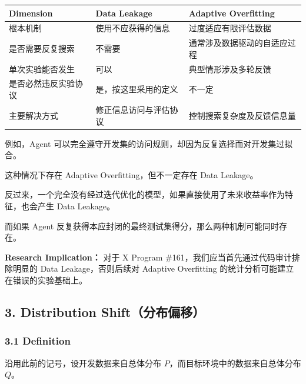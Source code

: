 \begin{readertable}
\begin{longtable}[]{@{}
  >{\raggedright\arraybackslash}p{}
  >{\raggedright\arraybackslash}p{}
  >{\raggedright\arraybackslash}p{}@{}}
\toprule
Dimension & Data Leakage & Adaptive Overfitting \\
\midrule
\endhead
根本机制 & 使用不应获得的信息 & 过度适应有限评估数据 \\
是否需要反复搜索 & 不需要 & 通常涉及数据驱动的自适应过程 \\
单次实验能否发生 & 可以 & 典型情形涉及多轮反馈 \\
是否必然违反实验协议 & 是，按这里采用的定义 & 不一定 \\
主要解决方式 & 修正信息访问与评估协议 & 控制搜索复杂度及反馈信息量 \\
\bottomrule
\end{longtable}
\end{readertable}

例如，Agent 可以完全遵守开发集的访问规则，却因为反复选择而对开发集过拟合。

这种情况下存在 Adaptive Overfitting，但不一定存在 Data Leakage。

反过来，一个完全没有经过迭代优化的模型，如果直接使用了未来收益率作为特征，也会产生 Data Leakage。

而如果 Agent 反复获得本应封闭的最终测试集得分，那么两种机制可能同时存在。

\textbf{Research Implication：} 对于 X Program \#161，我们应当首先通过代码审计排除明显的 Data Leakage，否则后续对 Adaptive Overfitting 的统计分析可能建立在错误的实验基础上。

\hypertarget{part-2-23-0001-distribution-shiftux5206ux5e03ux504fux79fb}{%
\subsection{3. Distribution Shift（分布偏移）}\label{part-2-23-0001-distribution-shiftux5206ux5e03ux504fux79fb}}

\hypertarget{part-2-23-0001-definition-1}{%
\subsubsection{3.1 Definition}\label{part-2-23-0001-definition-1}}

沿用此前的记号，设开发数据来自总体分布 \(P\)，而目标环境中的数据来自总体分布 \(Q\)。

